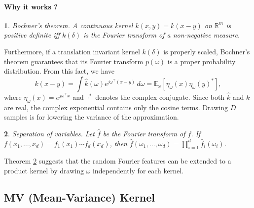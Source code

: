 \documentclass[english]{article}
\theoremstyle{plain}
\newtheorem{thm}{\protect\theoremname}
\theoremstyle{plain}
\providecommand{\theoremname}{Theorem}
\begin{document}
\paragraph{Why it works ?}
\begin{thm}
Bochner's theorem. A continuous kernel $k(x,y)=k(x-y)$ on $\mathbb{R}^{m}$
is positive definite iff $k(\delta)$ is the Fourier transform of
a non-negative measure.
\end{thm}
%
Furthermore, if a translation invariant kernel $k(\delta)$ is properly
scaled, Bochner's theorem guarantees that its Fourier transform $p(\omega)$
is a proper probability distribution. From this fact, we have 
\[
k(x-y)=\int\hat{k}(\omega)e^{j\omega^{\top}\left(x-y\right)}\, d\omega=\mathbb{E}_{\omega}\left[\eta_{\omega}(x)\eta_{\omega}(y)^{*}\right], 
\]
where $\eta_{\omega}(x)=e^{j\omega^{\top}x}$ and $\cdot^{*}$ denotes
the complex conjugate. Since both $\hat{k}$ and $k$ are real, the complex
exponential contains only the cosine terms. Drawing $D$ samples is
for lowering the variance of the approximation.
%
\begin{thm}
\label{thm:Separation-of-variables.}Separation of variables. Let
$\hat{f}$ be the Fourier transform of $f$. If $f(x_{1},\ldots,x_{d})=f_{1}(x_{1})\cdots f_{d}(x_{d})$,
then $\hat{f}(\omega_{1},\ldots,\omega_{d})=\prod_{i=1}^{d}\hat{f}_{i}(\omega_{i})$. 
\end{thm}
Theorem \ref{thm:Separation-of-variables.} suggests that the random
Fourier features can be extended to a product kernel by drawing $\omega$
independently for each kernel. 

\subsection{MV (Mean-Variance) Kernel \label{sec:mv_kernel}}
\end{document}
